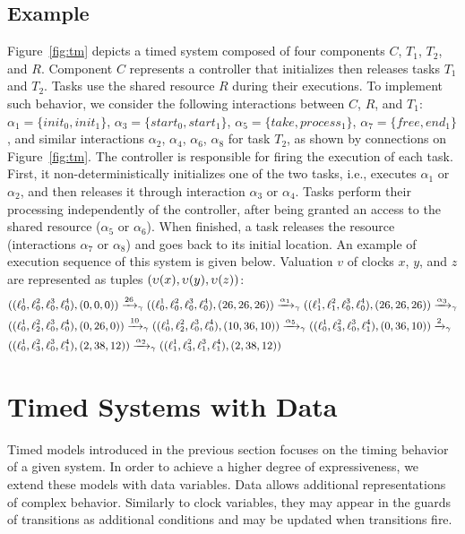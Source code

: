 \subsection{Example}\label{exp:run}

Figure~\ref{fig:tm} depicts a timed system composed of four components $C$, $T_1$, $T_2$, 
and $R$.
Component $C$ represents a  controller that initializes then releases tasks $T_1$ and $T_2$.
Tasks use the shared resource $R$ during their executions.
To implement such behavior, we consider the following interactions between $C$, $R$, and 
$T_1$: $\alpha_1=\{init_0, init_1\}$,
$\alpha_3=\{start_0, start_1\}$, $\alpha_5=\{ take, process_1\}$, $\alpha_7 = 
\{free, end_1 \}$, 
and similar interactions $\alpha_2$, $\alpha_4$, $\alpha_6$, $\alpha_8$ for task $T_2$, 
as shown by connections on Figure~\ref{fig:tm}.
The controller is responsible for firing
the execution of each task. First, it non-deterministically initializes one
of the two tasks, i.e., executes $\alpha_1$ or $\alpha_2$, and then
releases it through interaction $\alpha_3$ or $\alpha_4$.
Tasks perform their processing independently of the controller, after being granted an access 
to the shared resource ($\alpha_5$ or $\alpha_6$).
When finished, a task releases the resource (interactions $\alpha_7$ or $\alpha_8$) and goes 
back to its initial location.
An example of execution sequence of this system is given below. Valuation $v$ of clocks $x$, 
$y$, and $z$ are represented as tuples 
$(\upsilon(x),\upsilon(y),\upsilon(z))$:
\begin{displaymath}
\small{
\begin{split}
&((\ell_0^1,\ell_0^2,\ell_0^3,\ell_0^4),(0,0,0))\xrightarrow{26}_{\gamma}
((\ell_0^1,\ell_0^2,\ell_0^3,\ell_0^4),(26,26,26))\xrightarrow{\alpha_1}_{\gamma}
((\ell_1^1,\ell_1^2,\ell_0^3,\ell_0^4),(26,26,26))\xrightarrow{\alpha_3}_{\gamma}\\
&((\ell_0^1,\ell_2^2,\ell_0^3,\ell_0^4),(0,26,0))\xrightarrow{10}_{\gamma}
((\ell_0^1,\ell_2^2,\ell_0^3,\ell_0^4),(10,36,10))\xrightarrow{\alpha_5}_{\gamma}
((\ell_0^1,\ell_3^2,\ell_0^3,\ell_1^4),(0,36,10))\xrightarrow{2}_{\gamma}\\&
((\ell_0^1,\ell_3^2,\ell_0^3,\ell_1^4),(2,38,12))\xrightarrow{\alpha_2}_{\gamma}
((\ell_1^1,\ell_3^2,\ell_1^3,\ell_1^4),(2,38,12))
\end{split}
}
\end{displaymath}

\section{Timed Systems with Data}
Timed models introduced in the previous section focuses on the timing behavior of a given system.
In order to achieve a higher degree of expressiveness, we extend these models with data 
variables. Data allows additional representations of complex behavior. Similarly to clock 
variables, they may appear in the guards of transitions as additional conditions and may be 
updated when transitions fire.

